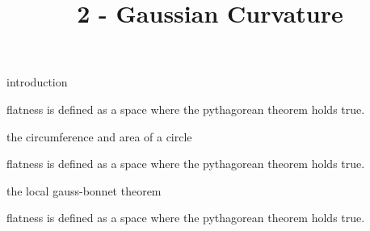 \documentclass{article}
\title{2 - Gaussian Curvature}
\newenvironment{andrew_section}[1]
    {
    \section{#1}
    \begin{itemize}
    }
    {
    \end{itemize}
    }
\begin{document}
\maketitle

\begin{andrew_section}{introduction}
    \item 
        flatness is defined as a space where the pythagorean theorem holds true.
\end{andrew_section}

\begin{andrew_section}{the circumference and area of a circle}
    \item 
        flatness is defined as a space where the pythagorean theorem holds true.
\end{andrew_section}

\begin{andrew_section}{the local gauss-bonnet theorem}
    \item 
        flatness is defined as a space where the pythagorean theorem holds true.
\end{andrew_section}
\end{document}
